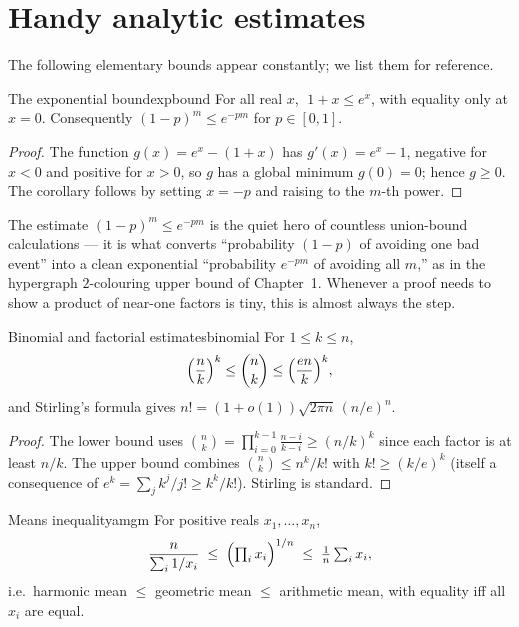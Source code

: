 \section{Handy analytic estimates}

The following elementary bounds appear constantly; we list them for reference.

\begin{proposition}{The exponential bound}{expbound}
For all real $x$, $\;1+x\le e^{x}$, with equality only at $x=0$. Consequently
$(1-p)^m\le e^{-pm}$ for $p\in[0,1]$.
\end{proposition}

\begin{proof}
The function $g(x)=e^x-(1+x)$ has $g'(x)=e^x-1$, negative for $x<0$ and positive
for $x>0$, so $g$ has a global minimum $g(0)=0$; hence $g\ge0$. The corollary
follows by setting $x=-p$ and raising to the $m$-th power.
\end{proof}

\begin{insight}
The estimate $(1-p)^m\le e^{-pm}$ is the quiet hero of countless union-bound
calculations --- it is what converts ``probability $(1-p)$ of avoiding one bad
event'' into a clean exponential ``probability $e^{-pm}$ of avoiding all $m$,''
as in the hypergraph $2$-colouring upper bound of Chapter~1. Whenever a proof
needs to show a product of near-one factors is tiny, this is almost always the
step.
\end{insight}

\begin{proposition}{Binomial and factorial estimates}{binomial}
For $1\le k\le n$,
\[
  \Bigl(\frac nk\Bigr)^{k}\le\binom nk\le\Bigl(\frac{en}{k}\Bigr)^{k},
\]
and Stirling's formula gives $n!=(1+o(1))\sqrt{2\pi n}\,(n/e)^n$.
\end{proposition}

\begin{proof}
The lower bound uses $\binom nk=\prod_{i=0}^{k-1}\frac{n-i}{k-i}\ge(n/k)^k$
since each factor is at least $n/k$. The upper bound combines
$\binom nk\le n^k/k!$ with $k!\ge(k/e)^k$ (itself a consequence of
$e^k=\sum_j k^j/j!\ge k^k/k!$). Stirling is standard.
\end{proof}

\begin{proposition}{Means inequality}{amgm}
For positive reals $x_1,\dots,x_n$,
\[
  \frac{n}{\sum_i 1/x_i}\;\le\;\Bigl(\textstyle\prod_i x_i\Bigr)^{1/n}\;\le\;
  \frac{1}{n}\sum_i x_i,
\]
i.e.\ harmonic mean $\le$ geometric mean $\le$ arithmetic mean, with equality
iff all $x_i$ are equal.
\end{proposition}

